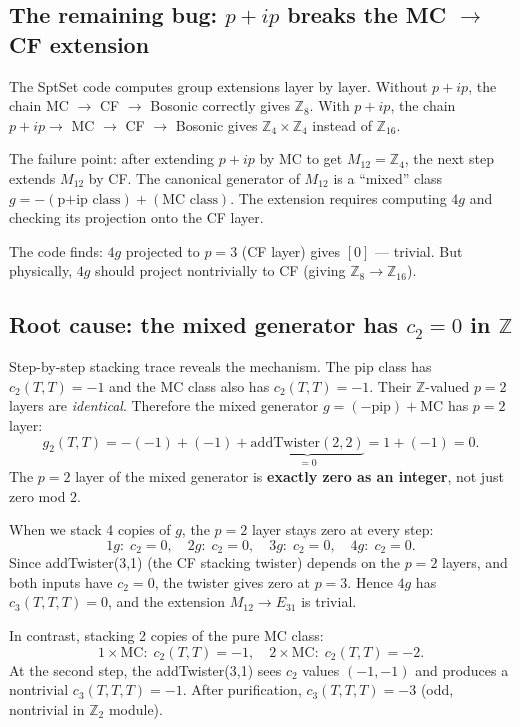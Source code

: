 \documentclass{SciPost}
\begin{document}
\subsection{The remaining bug: $p+ip$ breaks the MC $\to$ CF extension}

The SptSet code computes group extensions layer by layer.
Without $p+ip$, the chain MC $\to$ CF $\to$ Bosonic correctly gives $\mathbb{Z}_8$.
With $p+ip$, the chain $p+ip \to$ MC $\to$ CF $\to$ Bosonic gives $\mathbb{Z}_4 \times \mathbb{Z}_4$ instead of $\mathbb{Z}_{16}$.

The failure point: after extending $p+ip$ by MC to get $M_{12} = \mathbb{Z}_4$, the next step extends $M_{12}$ by CF.
The canonical generator of $M_{12}$ is a ``mixed'' class $g = -(\text{p+ip class}) + (\text{MC class})$.
The extension requires computing $4g$ and checking its projection onto the CF layer.

The code finds: $4g$ projected to $p=3$ (CF layer) gives $[0]$ --- trivial.
But physically, $4g$ should project nontrivially to CF (giving $\mathbb{Z}_8 \to \mathbb{Z}_{16}$).

\subsection{Root cause: the mixed generator has $c_2 = 0$ in $\mathbb{Z}$}

Step-by-step stacking trace reveals the mechanism.
The pip class has $c_2(T,T) = -1$ and the MC class also has $c_2(T,T) = -1$.
Their $\mathbb{Z}$-valued $p=2$ layers are \emph{identical}.
Therefore the mixed generator $g = (-\text{pip}) + \text{MC}$ has $p=2$ layer:
\begin{equation}
g_2(T,T) = -(-1) + (-1) + \underbrace{\mathrm{addTwister}(2,2)}_{=0} = 1 + (-1) = 0.
\end{equation}
The $p=2$ layer of the mixed generator is \textbf{exactly zero as an integer}, not just zero mod 2.

When we stack 4 copies of $g$, the $p=2$ layer stays zero at every step:
\begin{equation}
1g: \; c_2 = 0, \quad 2g: \; c_2 = 0, \quad 3g: \; c_2 = 0, \quad 4g: \; c_2 = 0.
\end{equation}
Since addTwister(3,1) (the CF stacking twister) depends on the $p=2$ layers, and both inputs have $c_2 = 0$, the twister gives zero at $p=3$.
Hence $4g$ has $c_3(T,T,T) = 0$, and the extension $M_{12} \to E_{31}$ is trivial.

In contrast, stacking 2 copies of the pure MC class:
\begin{equation}
1\times\text{MC}: \; c_2(T,T) = -1, \quad 2\times\text{MC}: \; c_2(T,T) = -2.
\end{equation}
At the second step, the addTwister(3,1) sees $c_2$ values $(-1, -1)$ and produces a nontrivial $c_3(T,T,T) = -1$.
After purification, $c_3(T,T,T) = -3$ (odd, nontrivial in $\mathbb{Z}_2$ module).
\end{document}
